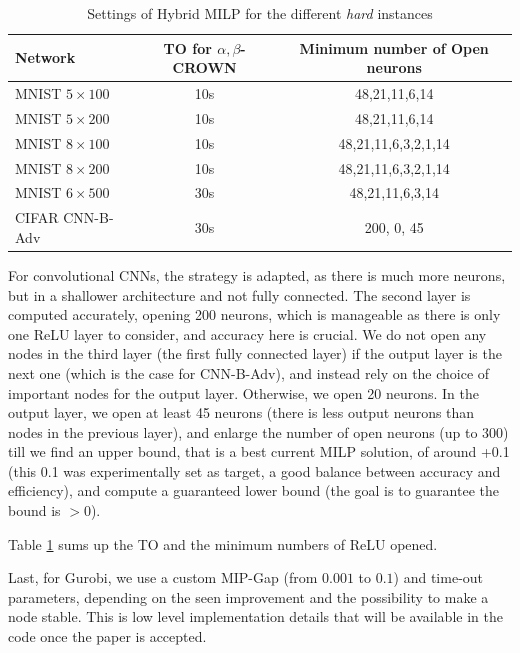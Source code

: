 \begin{table}[b!]
	\centering
		\caption{Settings of Hybrid MILP for the different {\em hard} instances}
	\begin{tabular}{||l||c|c||}
		\hline \hline
		Network & TO for $\alpha,\beta$-CROWN  & Minimum number of Open neurons  \\ 		  
		\hline
		MNIST $5 \times 100$ & 10s  & 48,21,11,6,14  \\ \hline
		MNIST $5 \times 200$ & 10s & 48,21,11,6,14  \\ \hline
		MNIST $8 \times 100$ & 10s  & 48,21,11,6,3,2,1,14  \\ \hline
		MNIST $8 \times 200$ & 10s & 48,21,11,6,3,2,1,14  \\ \hline
		MNIST $6 \times 500$ & 30s & 48,21,11,6,3,14 \\ \hline
		CIFAR CNN-B-Adv & 30s & 200, 0, 45 \\ \hline \hline
	\end{tabular}
	\label{table20}
	\end{table}


For convolutional CNNs, the strategy is adapted, as there is much more neurons, but in a shallower architecture and not fully connected. 
The second layer is computed accurately, opening 200 neurons, which is manageable as there is only one ReLU layer to consider, and accuracy here is crucial.
We do not open any nodes in the third layer (the first fully connected layer) if the output layer is the next one (which is the case for CNN-B-Adv), and instead rely on the choice of important nodes for the output layer. Otherwise, we open 20 neurons.
In the output layer, we open at least 45 neurons (there is less output neurons than nodes in the previous layer), and enlarge the number of open neurons (up to 300) till we find an upper bound, that is a best current MILP solution, of around +0.1 (this 0.1 was experimentally set as target, a good balance between accuracy and efficiency), and compute a guaranteed lower bound (the goal is to guarantee the bound is $>0$).

Table \ref{table20} sums up the TO and the minimum numbers of ReLU opened.






Last, for Gurobi, we use a custom MIP-Gap (from $0.001$ to $0.1$) and time-out parameters, depending on the seen improvement and the possibility to make a node stable. This is low level implementation details that will be available in the code once the paper is accepted.

